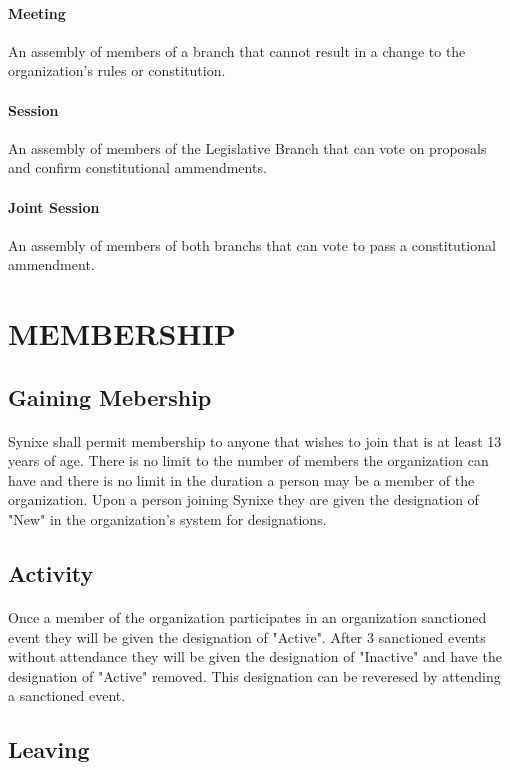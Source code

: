 \documentclass[10pt,a4paper]{article}
\begin{document}
\paragraph{Meeting} An assembly of members of a branch that cannot result in a change to the organization's rules or constitution.
\paragraph{Session} An assembly of members of the Legislative Branch that can vote on proposals and confirm constitutional ammendments.
\paragraph{Joint Session} An assembly of members of both branchs that can vote to pass a constitutional ammendment.
\section{MEMBERSHIP}
\subsection{Gaining Mebership}
\paragraph{}
Synixe shall permit membership to anyone that wishes to join that is at least 13 years of age. There is no limit to the number of members the organization can have and there is no limit in the duration a person may be a member of the organization. Upon a person joining Synixe they are given the designation of "New" in the organization's system for designations.
\subsection{Activity}
\paragraph{}
Once a member of the organization participates in an organization sanctioned event they will be given the designation of "Active". After 3 sanctioned events without attendance they will be given the designation of "Inactive" and have the designation of "Active" removed.
This designation can be reveresed by attending a sanctioned event.
\subsection{Leaving}
\end{document}
